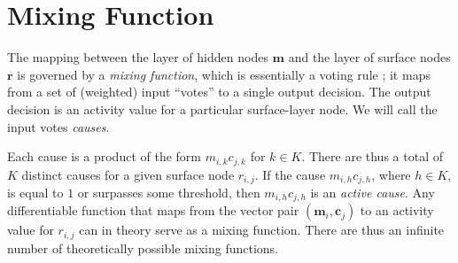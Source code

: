 
		
\section{Mixing Function}
\label{ch4:sec:mixing-function}

The mapping between the layer of hidden nodes $\mathbf{m}$ 
and the layer of surface nodes $\mathbf{r}$ is governed by a 
\emph{mixing function}, which is essentially
a voting rule \citep{saund:94}; it maps from a set of (weighted)
input ``votes'' to a single output decision.  The output decision is 
an activity value for a particular surface-layer node. We will call the input votes
\emph{causes}. 

Each cause is a product of the form $m_{i,k} c_{j,k}$ for $k \in K$.
There are thus a total of $K$ distinct causes for a given surface node $r_{i,j}$. 
If the cause $m_{i,h} c_{j,h}$, where $h \in K$, is equal to $1$ or surpasses some
threshold, then $m_{i,h} c_{j,h}$ is an \emph{active cause}.
Any differentiable function
that maps from the vector pair $(\mathbf{m}_i, \mathbf{c}_j)$ 
to an activity value for $r_{i,j}$ can in theory serve as a mixing function. 
There are thus an infinite number of theoretically possible mixing functions.

